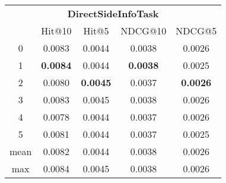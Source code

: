 \documentclass{article}
\begin{document}
 

\begin{tabular}{c|cccc}

\multicolumn{5}{c}{\textbf{DirectSideInfoTask}} \\
\noalign{\smallskip}
\noalign{\smallskip}
\toprule
\multicolumn{1}{c}{Template ID} & \multicolumn{1}{|c}{Hit@10} & \multicolumn{1}{c}{Hit@5} & \multicolumn{1}{c}{NDCG@10} & \multicolumn{1}{c}{NDCG@5} \\
\midrule
0 & 0.0083 & 0.0044 & 0.0038 & 0.0026 \\
1 & \textbf{0.0084} & 0.0044 & \textbf{0.0038} & 0.0025 \\
2 & 0.0080 & \textbf{0.0045} & 0.0037 & \textbf{0.0026} \\
3 & 0.0083 & 0.0045 & 0.0038 & 0.0026 \\
4 & 0.0078 & 0.0044 & 0.0037 & 0.0026 \\
5 & 0.0081 & 0.0044 & 0.0037 & 0.0025 \\
\midrule
mean & 0.0082 & 0.0044 & 0.0038 & 0.0026 \\
max & 0.0084 & 0.0045 & 0.0038 & 0.0026 \\
\bottomrule

\end{tabular}
\end{document}
